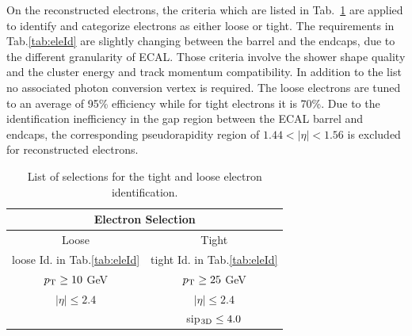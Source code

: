 On the reconstructed electrons, the criteria which are listed in Tab.~\ref{tab:eleSel} are applied to identify and categorize electrons as either loose or tight.
The requirements in Tab.\ref{tab:eleId} are slightly changing between the barrel and the endcaps, due to the different granularity of ECAL. Those criteria involve the shower shape quality and the cluster energy and track momentum compatibility. In addition to the list no associated photon conversion vertex is required. The loose electrons are tuned to an average of 95\% efficiency while for tight electrons it is 70\%. 
Due to the identification inefficiency in the gap region between the ECAL barrel and endcaps, the corresponding pseudorapidity region of $1.44<|\eta|<1.56$ is excluded for reconstructed electrons.\\ 
\renewcommand{\arraystretch}{1.5}
\begin{table}[ht]
\begin{center}
\begin{tabular}{|c|c|}\hline
\multicolumn{2}{|c|}{Electron Selection} \\\hline\hline
 Loose & Tight \\\hline
loose Id. in Tab.\ref{tab:eleId} & tight Id. in Tab.\ref{tab:eleId}\\\hline
$p_{\rm T}\geq10$ GeV & $p_{\rm T}\geq25$ GeV \\\hline
$|\eta|\leq2.4$ & $|\eta|\leq2.4$ \\\hline
& sip$_{\rm 3D}\leq4.0$\\
\hline
\end{tabular}
\end{center}
\caption{List of selections for the tight and loose electron identification.}\label{tab:eleSel}
\end{table}
\renewcommand{\arraystretch}{1}
\renewcommand{\arraystretch}{1.5}

